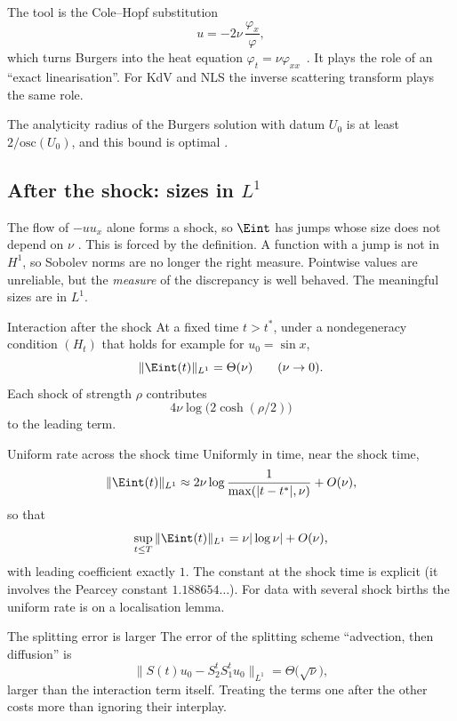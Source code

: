 The tool is the Cole--Hopf substitution
\[
u=-2\nu\,\frac{\varphi_x}{\varphi},
\]
which turns Burgers into the heat equation $\varphi_t=\nu\varphi_{xx}$~\cite{ch}. It plays the role of an ``exact linearisation''. For KdV and NLS the inverse scattering transform plays the same role.

The analyticity radius of the Burgers solution with datum $U_0$ is at least $2/\mathrm{osc}(U_0)$, and this bound is optimal  \proved.

\subsection{After the shock: sizes in $L^1$}

The flow of $-uu_x$ alone forms a shock, so $\Eint$ has jumps whose size does not depend on $\nu$  \modulo{[F1]}. This is forced by the definition. A function with a jump is not in $H^1$, so Sobolev norms are no longer the right measure. Pointwise values are unreliable, but the \emph{measure} of the discrepancy is well behaved. The meaningful sizes are in $L^1$.

\begin{theorem}{Interaction after the shock  }\label{thm:shock}
At a fixed time $t>t^*$, under a nondegeneracy condition $(H_t)$ that holds for example for $u_0=\sin x$,
\[
\|\Eint(t)\|_{L^1}=\Theta(\nu)\qquad(\nu\to0).
\]
Each shock of strength $\rho$ contributes
\[
4\nu\log\big(2\cosh(\rho/2)\big)
\]
to the leading term.

\end{theorem}

\begin{theorem}{Uniform rate across the shock time  }\label{thm:uniform}
Uniformly in time, near the shock time,
\[
\|\Eint(t)\|_{L^1}\approx2\nu\log\frac{1}{\max(|t-t^*|,\nu)}+O(\nu),
\]
so that
\[
\sup_{t\le T}\|\Eint(t)\|_{L^1}=\nu|\log\nu|+O(\nu),
\]
with leading coefficient exactly $1$. The constant at the shock time is explicit (it involves the Pearcey constant $1.188654\ldots$). For data with several shock births the uniform rate is \condl{} on a localisation lemma.

\end{theorem}

\begin{proposition}{The splitting error is larger  \proved}\label{prop:splitting}
The error of the splitting scheme ``advection, then diffusion'' is
\[
\|S(t)u_0-S_2^tS_1^tu_0\|_{L^1}=\Theta\big(\sqrt\nu\big),
\]
larger than the interaction term itself. Treating the terms one after the other costs more than ignoring their interplay.

\end{proposition}

